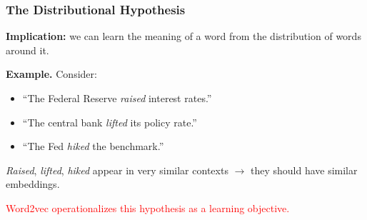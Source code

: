 \documentclass[notes,11pt, aspectratio=169]{beamer}
\begin{document}
\begin{frame}
\frametitle{The Distributional Hypothesis}


\vspace{12pt}
\textbf{Implication:} we can learn the meaning of a word from the distribution of words around it.

\vspace{6pt}
\textbf{Example.} Consider:
\begin{itemize}
    \item ``The Federal Reserve \emph{raised} interest rates.''
    \item ``The central bank \emph{lifted} its policy rate.''
    \item ``The Fed \emph{hiked} the benchmark.''
\end{itemize}

\vspace{4pt}
\textit{Raised}, \textit{lifted}, \textit{hiked} appear in very similar contexts $\to$ they should have similar embeddings.

\vspace{6pt}
\textcolor{red}{Word2vec operationalizes this hypothesis as a learning objective.}
\end{frame}
\end{document}
